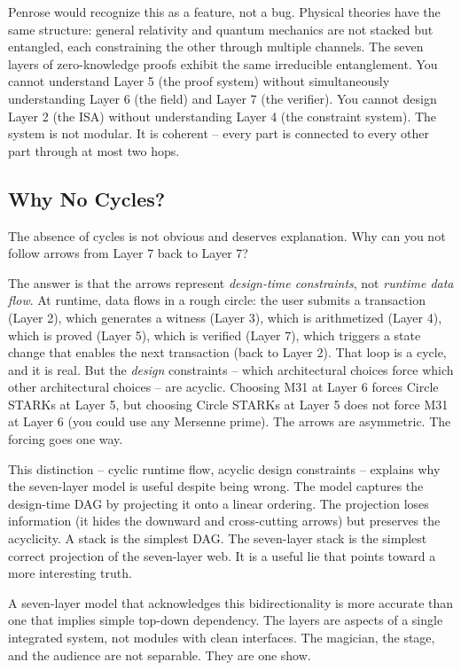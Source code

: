 \documentclass[
  11pt,
  openany]{report}
\begin{document}
Penrose would recognize this as a feature, not a bug. Physical theories have the
same structure: general relativity and quantum mechanics are not stacked but
entangled, each constraining the other through multiple channels. The seven
layers of zero-knowledge proofs exhibit the same irreducible entanglement. You
cannot understand Layer 5 (the proof system) without simultaneously
understanding Layer 6 (the field) and Layer 7 (the verifier). You cannot design
Layer 2 (the ISA) without understanding Layer 4 (the constraint system). The
system is not modular. It is coherent -- every part is connected to every other
part through at most two hops.

\subsection{Why No Cycles?}\label{why-no-cycles}

The absence of cycles is not obvious and deserves explanation. Why can you not
follow arrows from Layer 7 back to Layer 7?

The answer is that the arrows represent \emph{design-time constraints}, not
\emph{runtime data flow}. At runtime, data flows in a rough circle: the user
submits a transaction (Layer 2), which generates a witness (Layer 3), which is
arithmetized (Layer 4), which is proved (Layer 5), which is verified (Layer 7),
which triggers a state change that enables the next transaction (back to Layer
2). That loop is a cycle, and it is real. But the \emph{design} constraints --
which architectural choices force which other architectural choices -- are
acyclic. Choosing M31 at Layer 6 forces Circle STARKs at Layer 5, but choosing
Circle STARKs at Layer 5 does not force M31 at Layer 6 (you could use any
Mersenne prime). The arrows are asymmetric. The forcing goes one way.

This distinction -- cyclic runtime flow, acyclic design constraints -- explains
why the seven-layer model is useful despite being wrong. The model captures the
design-time DAG by projecting it onto a linear ordering. The projection loses
information (it hides the downward and cross-cutting arrows) but preserves the
acyclicity. A stack is the simplest DAG. The seven-layer stack is the simplest
correct projection of the seven-layer web. It is a useful lie that points toward
a more interesting truth.

A seven-layer model that acknowledges this bidirectionality is more accurate
than one that implies simple top-down dependency. The layers are aspects of a
single integrated system, not modules with clean interfaces. The magician, the
stage, and the audience are not separable. They are one show.
\end{document}
